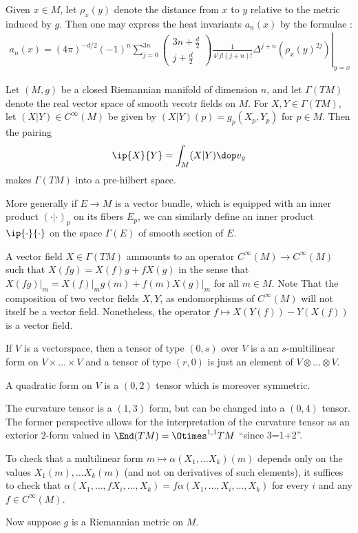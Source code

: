 Given $x\in M$, let $\rho_x(y)$ denote the distance from $x$ to $y$ relative to the metric induced by $g$.  Then one may express the heat invariants $a_n(x)$ by the formulae \cite[Theorem 1.2.1]{polterovichHeatInvariantsRiemannian2000}:
\begin{align}
    a_n(x) = \left.(4 \pi)^{-d / 2}(-1)^n \sum_{j=0}^{3 n}\left(\begin{array}{c}
                                                                        3 n+\frac{d}{2} \\
                                                                        j+\frac{d}{2}
                                                                    \end{array}\right) \frac{1}{4^j j !(j+n) !} \Delta^{j+n}\left(\rho_x(y)^{2 j}\right)\right|_{y=x}
\end{align}


\newpage

Let $(M,g)$ be a closed Riemannian manifold of dimension $n$, and let $\Gamma(TM)$ denote the real vector space of smooth vecotr fields on $M$. For $X,Y \in \Gamma(TM)$, let $(X|Y) \in C^\infty(M)$ be given by $(X|Y)(p) = g_p(X_p,Y_p)$ for $p \in M$. Then the pairing
\begin{align*}
    \ip{X}{Y} = \int_M (X|Y) \dop v_g
\end{align*}
makes $\Gamma(TM)$ into a pre-hilbert space.

More generally if $E \to M$ is a vector bundle, which is equipped with an inner product $(\cdot | \cdot)_p$ on its fibers $E_p$, we can similarly define an inner product $\ip{\cdot}{\cdot}$ on the space $\Gamma(E)$ of smooth section of $E$.

\newpage
A vector field $X \in \Gamma(TM)$ ammounts to an operator $C^\infty(M) \to C^\infty(M)$ such that $X(fg)= X(f)g+fX(g)$ in the sense that $X(fg)\vert_m = X(f)\vert_m g(m) + f(m) X(g)\vert_m$ for all $m \in M$. Note That the composition of two vector fields $X,Y$, as endomorphisms of $C^\infty(M)$ will not itself be a vector field. Nonetheless, the operator $f \mapsto X(Y(f)) - Y(X(f))$ is a vector field.

If $V$ is a vectorspace, then a tensor of type $(0,s)$ over $V$ is a an $s$-multilinear form on $V\times\dots \times V$ and a tensor of type $(r,0)$ is just an element of $V \otimes \dots \otimes V$.

A quadratic form on $V$ is a $(0,2)$ tensor which is moreover symmetric.

The curvature tensor is a $(1,3)$ form, but can be changed into a $(0,4)$ tensor. The former perspective allows for the interpretation of the curvature tensor as an exterior $2$-form valued in $\End(TM) = \Otimes^{1,1} TM$ ``since 3=1+2''.

To check that a multilinear form $m \mapsto \alpha(X_1,\dots X_k)(m)$ depends only on the values $X_1(m),\dots X_k(m)$ (and not on derivatives of such elements), it suffices to check that $\alpha(X_1 ,\dots, fX_i,\dots, X_k) = f \alpha(X_1 ,\dots, X_i,\dots, X_k)$ for every $i$ and any $f\in C^\infty(M)$.

Now suppose $g$ is a Riemannian metric on $M$.